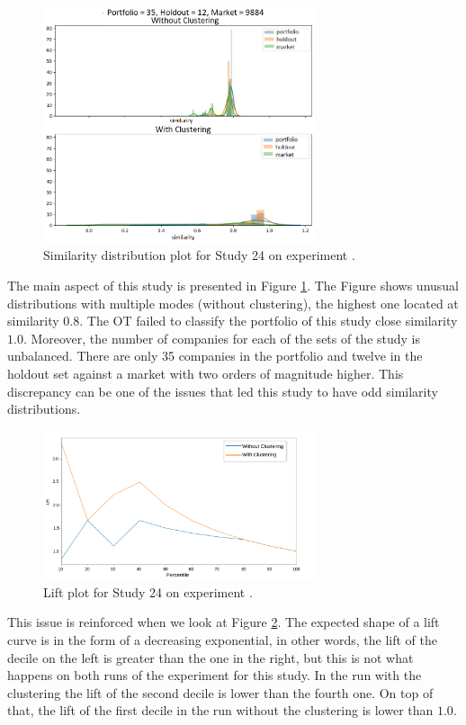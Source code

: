 \begin{figure}[!ht]
   \centering
   \includegraphics[width=8cm]{fig/ch4-outlier-study-24-exp-2.png}
   \caption{Similarity distribution plot for Study 24 on experiment \nameExperimentII{}.}
   \label{fig:outlier-study-24-exp-2}
\end{figure}

The main aspect of this study is presented in Figure \ref{fig:outlier-study-24-exp-2}. The Figure shows unusual distributions with multiple modes (without clustering), the highest one located at similarity $0.8$. The OT failed to classify the portfolio of this study close similarity $1.0$. Moreover, the number of companies for each of the sets of the study is unbalanced. There are only 35 companies in the portfolio and twelve in the holdout set against a market with two orders of magnitude higher. This discrepancy can be one of the issues that led this study to have odd similarity distributions.

\begin{figure}[!ht]
   \centering
   \includegraphics[width=8cm]{fig/ch4-outlier-study-24-lift-exp-2.png}
   \caption{Lift plot for Study 24 on experiment \nameExperimentII{}.}
   \label{fig:outlier-study-24-lift-exp-2}
\end{figure}

This issue is reinforced when we look at Figure \ref{fig:outlier-study-24-lift-exp-2}. The expected shape of a lift curve is in the form of a decreasing exponential, in other words, the lift of the decile on the left is greater than the one in the right, but this is not what happens on both runs of the experiment for this study. In the run with the clustering the lift of the second decile is lower than the fourth one. On top of that, the lift of the first decile in the run without the clustering is lower than $1.0$. 

